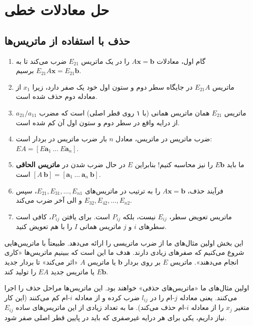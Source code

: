 \documentclass[12pt, a4paper]{book}
\begin{document}
	
	\onehalfspacing
	
	\chapter{حل معادلات خطی}
	\section{حذف با استفاده از ماتریس‌ها}
	
	\begin{enumerate}
		\item گام اول، معادلات $A\mathbf{x}=\mathbf{b}$ را در یک ماتریس $E_{21}$ ضرب می‌کند تا به $E_{21}A\mathbf{x} = E_{21}\mathbf{b}$ برسیم.
		\item ماتریس $E_{21}A$ در جایگاه سطر دوم و ستون اول خود یک صفر دارد، زیرا $x_1$ از معادله دوم حذف شده است.
		\item ماتریس $E_{21}$ همان ماتریس همانی (با ۱ روی قطر اصلی) است که مضرب $a_{21}/a_{11}$ از درایه واقع در سطر دوم و ستون اول آن کم شده است.
		\item ضرب ماتریس در ماتریس، معادل $n$ بار ضرب ماتریس در بردار است: $EA = [E\mathbf{a}_1 \ \dots \ E\mathbf{a}_n]$.
		\item ما باید $E\mathbf{b}$ را نیز محاسبه کنیم! بنابراین $E$ در حال ضرب شدن در \textbf{ماتریس الحاقی} $[A \ \mathbf{b}] = [\mathbf{a}_1 \ \dots \ \mathbf{a}_n \ \mathbf{b}]$ است.
		\item فرآیند حذف، $A\mathbf{x}=\mathbf{b}$ را به ترتیب در ماتریس‌های $E_{21}, E_{31}, \dots, E_{n1}$، سپس $E_{32}, E_{42}, \dots, E_{n2}$ و الی آخر ضرب می‌کند.
		\item ماتریس تعویض سطر، $E_{ij}$ نیست، بلکه $P_{ij}$ است. برای یافتن $P_{ij}$، کافی است سطرهای $i$ و $j$ ماتریس همانی $I$ را با هم تعویض کنید.
	\end{enumerate}
	
	این بخش اولین مثال‌های ما از ضرب ماتریسی را ارائه می‌دهد. طبیعتاً با ماتریس‌هایی شروع می‌کنیم که صفرهای زیادی دارند. هدف ما این است که ببینیم ماتریس‌ها «کاری انجام می‌دهند». ماتریس $E$ بر روی بردار $\mathbf{b}$ یا ماتریس $A$ «اثر می‌کند» تا بردار جدید $E\mathbf{b}$ یا ماتریس جدید $EA$ را تولید کند.
	
	اولین مثال‌های ما «ماتریس‌های حذفی» خواهند بود. این ماتریس‌ها مراحل حذف را اجرا می‌کنند. یعنی معادله $j$-ام را در $l_{ij}$ ضرب کرده و از معادله $i$-ام کم می‌کنند (این کار متغیر $x_j$ را از معادله $i$-ام حذف می‌کند). ما به تعداد زیادی از این ماتریس‌های ساده $E_{ij}$ نیاز داریم، یکی برای هر درایه غیرصفری که باید در پایین قطر اصلی صفر شود.
	
\end{document}
